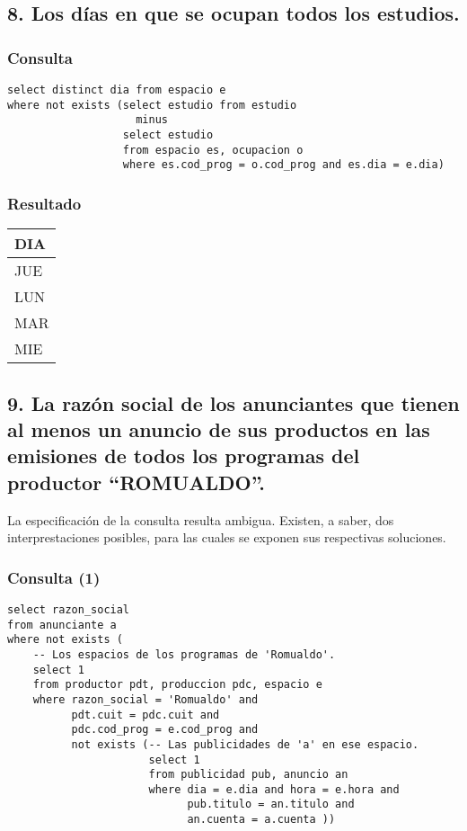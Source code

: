 \subsection*{8. \normalsize{Los d\'ias en que se ocupan todos los estudios.}}

\subsubsection*{Consulta}
\begin{lstlisting} 
select distinct dia from espacio e
where not exists (select estudio from estudio
                    minus
                  select estudio 
                  from espacio es, ocupacion o
                  where es.cod_prog = o.cod_prog and es.dia = e.dia)
\end{lstlisting}

\subsubsection*{Resultado}
\begin{tabular}{|l|}
  \hline
    \bf{DIA} \\ 
  \hline
    JUE \\
    LUN \\
    MAR \\
    MIE \\
  \hline
\end{tabular} 

\subsection*{9. \normalsize{La raz\'on social de los anunciantes que tienen al menos un anuncio de sus productos en las emisiones de todos los programas del productor ``ROMUALDO''.}}

La especificación de la consulta resulta ambigua. Existen, a saber, dos interprestaciones posibles, para las cuales se exponen sus respectivas soluciones.

\subsubsection*{Consulta (1)}

\begin{lstlisting} 
select razon_social
from anunciante a
where not exists (
    -- Los espacios de los programas de 'Romualdo'.
    select 1
    from productor pdt, produccion pdc, espacio e
    where razon_social = 'Romualdo' and
          pdt.cuit = pdc.cuit and 
          pdc.cod_prog = e.cod_prog and
          not exists (-- Las publicidades de 'a' en ese espacio.
                      select 1 
                      from publicidad pub, anuncio an
                      where dia = e.dia and hora = e.hora and
                            pub.titulo = an.titulo and
                            an.cuenta = a.cuenta ))
\end{lstlisting}

